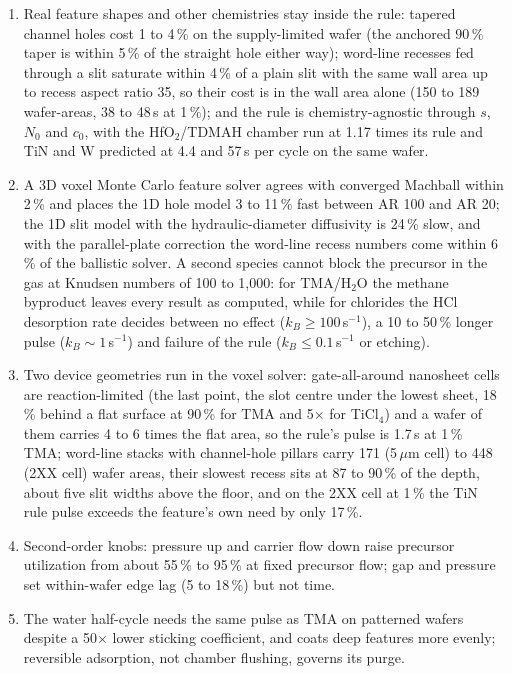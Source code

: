 \documentclass[11pt,letterpaper]{article}
\begin{document}
\begin{enumerate}
\item Real feature shapes and other chemistries stay inside the rule: tapered channel holes cost 1 to 4\,\% on the supply-limited wafer (the anchored 90\,\% taper is within 5\,\% of the straight hole either way); word-line recesses fed through a slit saturate within 4\,\% of a plain slit with the same wall area up to recess aspect ratio 35, so their cost is in the wall area alone (150 to 189 wafer-areas, 38 to 48\,s at 1\,\%); and the rule is chemistry-agnostic through $s$, $N_0$ and $c_0$, with the HfO$_2$/TDMAH chamber run at 1.17 times its rule and TiN and W predicted at 4.4 and 57\,s per cycle on the same wafer.
\item A 3D voxel Monte Carlo feature solver agrees with converged Machball within 2\,\% and places the 1D hole model 3 to 11\,\% fast between AR 100 and AR 20; the 1D slit model with the hydraulic-diameter diffusivity is 24\,\% slow, and with the parallel-plate correction the word-line recess numbers come within 6\,\% of the ballistic solver. A second species cannot block the precursor in the gas at Knudsen numbers of 100 to 1,000: for TMA/H$_2$O the methane byproduct leaves every result as computed, while for chlorides the HCl desorption rate decides between no effect ($k_B \geq 100$\,s$^{-1}$), a 10 to 50\,\% longer pulse ($k_B \sim 1$\,s$^{-1}$) and failure of the rule ($k_B \leq 0.1$\,s$^{-1}$ or etching).
\item Two device geometries run in the voxel solver: gate-all-around nanosheet cells are reaction-limited (the last point, the slot centre under the lowest sheet, 18\,\% behind a flat surface at 90\,\% for TMA and 5$\times$ for TiCl$_4$) and a wafer of them carries 4 to 6 times the flat area, so the rule's pulse is 1.7\,s at 1\,\% TMA; word-line stacks with channel-hole pillars carry 171 (5\,$\mu$m cell) to 448 (2XX cell) wafer areas, their slowest recess sits at 87 to 90\,\% of the depth, about five slit widths above the floor, and on the 2XX cell at 1\,\% the TiN rule pulse exceeds the feature's own need by only 17\,\%.
\item Second-order knobs: pressure up and carrier flow down raise precursor utilization from about 55\,\% to 95\,\% at fixed precursor flow; gap and pressure set within-wafer edge lag (5 to 18\,\%) but not time.
\item The water half-cycle needs the same pulse as TMA on patterned wafers despite a 50$\times$ lower sticking coefficient, and coats deep features more evenly; reversible adsorption, not chamber flushing, governs its purge.

\end{enumerate}
\end{document}
